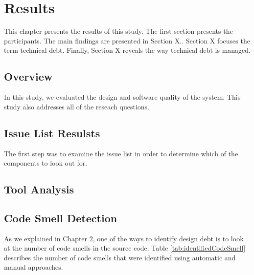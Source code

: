 
\chapter{Results}

This chapter presents the results of this study. The first section presents the participants. The main findings are presented in Section X.. Section X focuses the term technical debt.  Finally, Section X reveals the way technical debt is managed.



\section{Overview}
In this study, we evaluated the design and software quality of the system. This study also addresses all of the reseach questions. 


\section{Issue List Resulsts}
The first step was to examine the issue list in order to determine which of the components to look out for. 

\section{Tool Analysis}






\section{Code Smell Detection}
\label{sub:code_smell_detection}
As we explained in Chapter 2, one of the ways to identify design debt is to look at the number of code smells in the source code. Table \ref{tab:identifiedCodeSmell} describes the number of code smells that were identified using automatic and manual approaches. 

